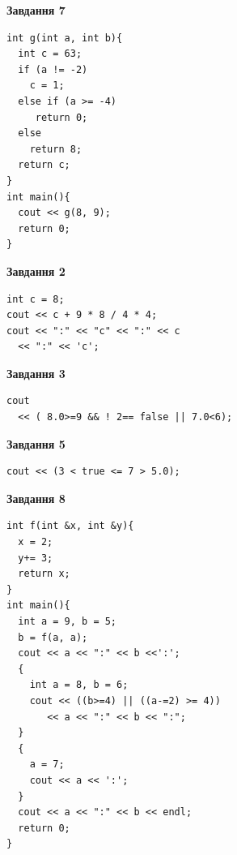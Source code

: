 \documentclass[12pt, ukrainian]{article}
\begin{document}
{\begin {large}
\begin{minipage}[t]{7.0cm}
\begin{center}
\textbf{Завдання 7}
\end{center}
\vspace{-8mm}

\begin{verbatim}
int g(int a, int b){
  int c = 63;
  if (a != -2)
    c = 1;
  else if (a >= -4)
     return 0;
  else
    return 8;
  return c;
}
int main(){
  cout << g(8, 9);
  return 0;
}
\end{verbatim}

\end{minipage}
\vline \hspace{1mm}
\begin{minipage}[t]{11.0cm}

\begin{center}
\textbf{Завдання 2}
\end{center}
\vspace{-8mm}

\begin{verbatim}
int c = 8;
cout << c + 9 * 8 / 4 * 4;
cout << ":" << "c" << ":" << c 
  << ":" << 'c';
\end{verbatim}



\begin{center}
\textbf{Завдання 3}
\end{center}
\vspace{-8mm}

\begin{verbatim}
cout 
  << ( 8.0>=9 && ! 2== false || 7.0<6);
\end{verbatim}



\begin{center}
\textbf{Завдання 5}
\end{center}
\vspace{-8mm}

\begin{verbatim}
cout << (3 < true <= 7 > 5.0);
\end{verbatim}



\begin{center}
\textbf{Завдання 8}
\end{center}
\vspace{-8mm}

\begin{verbatim}
int f(int &x, int &y){
  x = 2;
  y+= 3;
  return x;
}
int main(){
  int a = 9, b = 5;
  b = f(a, a);
  cout << a << ":" << b <<':';
  {
    int a = 8, b = 6;
    cout << ((b>=4) || ((a-=2) >= 4))
       << a << ":" << b << ":";
  }
  {
    a = 7;
    cout << a << ':';
  }
  cout << a << ":" << b << endl;
  return 0;
}
\end{verbatim}


\end{minipage}
\end{large}}
\end{document}
